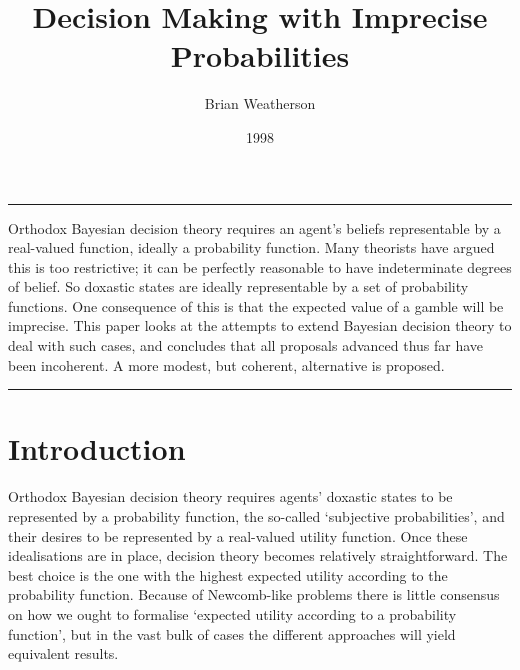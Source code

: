 \documentclass[
  10pt,
  letterpaper,
  DIV=11,
  numbers=noendperiod,
  twoside]{scrartcl}
\title{Decision Making with Imprecise Probabilities}
\author{Brian Weatherson}
\date{1998}
\renewenvironment{abstract}
 {\vspace{-1.25cm}
 \quotation\small\noindent\rule{\linewidth}{.5pt}\par\smallskip
 \noindent }
 {\par\noindent\rule{\linewidth}{.5pt}\endquotation}
\begin{document}
\maketitle
\begin{abstract}
Orthodox Bayesian decision theory requires an agent's beliefs
representable by a real-valued function, ideally a probability function.
Many theorists have argued this is too restrictive; it can be perfectly
reasonable to have indeterminate degrees of belief. So doxastic states
are ideally representable by a set of probability functions. One
consequence of this is that the expected value of a gamble will be
imprecise. This paper looks at the attempts to extend Bayesian decision
theory to deal with such cases, and concludes that all proposals
advanced thus far have been incoherent. A more modest, but coherent,
alternative is proposed.
\end{abstract}

\section{Introduction}\label{introduction}

Orthodox Bayesian decision theory requires agents' doxastic states to be
represented by a probability function, the so-called `subjective
probabilities', and their desires to be represented by a real-valued
utility function. Once these idealisations are in place, decision theory
becomes relatively straightforward. The best choice is the one with the
highest expected utility according to the probability function. Because
of Newcomb-like problems there is little consensus on how we ought to
formalise `expected utility according to a probability function', but in
the vast bulk of cases the different approaches will yield equivalent
results.
\end{document}
